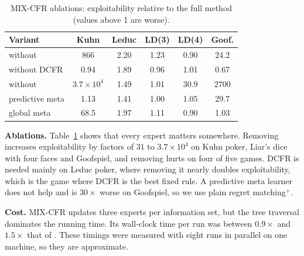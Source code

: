 \begin{table}[t]
\centering
\caption{MIX-CFR ablations: exploitability relative to the full method (values above 1 are
worse).}
\label{tab:ablation}
\setlength{\tabcolsep}{3pt}
\begin{tabular}{@{}lccccc@{}}
\toprule
\textbf{Variant} & \textbf{Kuhn} & \textbf{Leduc} & \textbf{LD(3)} & \textbf{LD(4)} & \textbf{Goof.} \\
\midrule
without \cfrp{}       & 866   & 2.20 & 1.23 & 0.90 & 24.2 \\
without DCFR          & 0.94  & 1.89 & 0.96 & 1.01 & 0.67 \\
without \pcfrp{}      & $3.7\times10^{4}$ & 1.49 & 1.01 & 30.9 & 2700 \\
predictive meta       & 1.13  & 1.41 & 1.00 & 1.05 & 29.7 \\
global meta           & 68.5  & 1.97 & 1.11 & 0.90 & 1.03 \\
\bottomrule
\end{tabular}
\end{table}

\textbf{Ablations.} Table~\ref{tab:ablation} shows that every expert matters somewhere.
Removing \pcfrp{} increases exploitability by factors of $31$ to $3.7\times10^{4}$ on Kuhn
poker, Liar's dice with four faces and Goofspiel, and removing \cfrp{} hurts on four of five games. DCFR is needed mainly on
Leduc poker, where removing it nearly doubles exploitability, which is the game where DCFR is
the best fixed rule. A predictive meta learner does not help and is $30\times$ worse on
Goofspiel, so we use plain regret matching$^+$.

\textbf{Cost.} MIX-CFR updates three experts per information set, but the tree traversal
dominates the running time. Its wall-clock time per run was between $0.9\times$ and
$1.5\times$ that of \cfrp{}. These timings were measured with eight runs in parallel on one
machine, so they are approximate.
